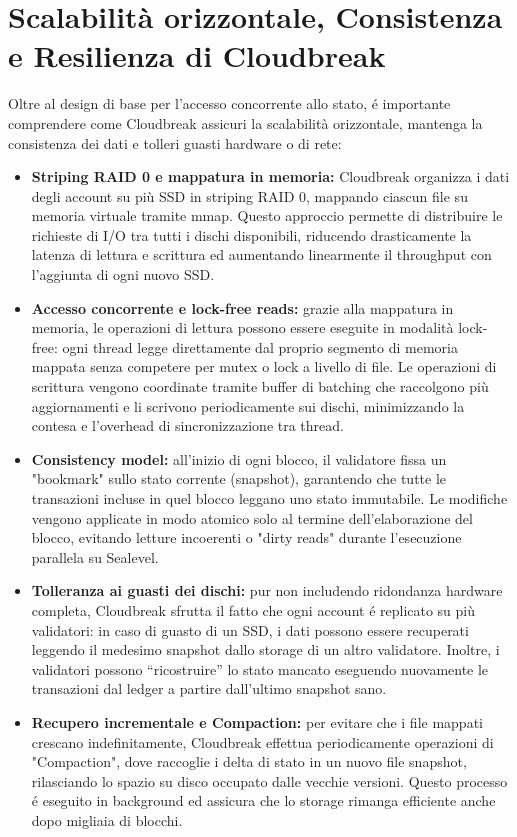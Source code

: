 \documentclass[a4paper,12pt]{report}
\begin{document}
	\section{Scalabilità orizzontale, Consistenza e Resilienza di Cloudbreak}
	Oltre al design di base per l'accesso concorrente allo stato, é importante comprendere come Cloudbreak assicuri la scalabilità orizzontale, mantenga la consistenza dei dati e tolleri guasti hardware o di rete:
	\begin{itemize}
		\item \textbf{Striping RAID 0 e mappatura in memoria:} Cloudbreak organizza i dati degli account su più SSD in striping RAID 0, mappando ciascun file su memoria virtuale tramite mmap. Questo approccio permette di distribuire le richieste di I/O tra tutti i dischi disponibili, riducendo drasticamente la latenza di lettura e scrittura ed aumentando linearmente il throughput con l’aggiunta di ogni nuovo SSD.
		\item \textbf{Accesso concorrente e lock-free reads:} grazie alla mappatura in memoria, le operazioni di lettura possono essere eseguite in modalità lock-free: ogni thread legge direttamente dal proprio segmento di memoria mappata senza competere per mutex o lock a livello di file. Le operazioni di scrittura vengono coordinate tramite buffer di batching che raccolgono più aggiornamenti e li scrivono periodicamente sui dischi, minimizzando la contesa e l’overhead di sincronizzazione tra thread.
		\item \textbf{Consistency model:} all’inizio di ogni blocco, il validatore fissa un "bookmark" sullo stato corrente (snapshot), garantendo che tutte le transazioni incluse in quel blocco leggano uno stato immutabile. Le modifiche vengono applicate in modo atomico solo al termine dell’elaborazione del blocco, evitando letture incoerenti o "dirty reads" durante l’esecuzione parallela su Sealevel.
		\item \textbf{Tolleranza ai guasti dei dischi:} pur non includendo ridondanza hardware completa, Cloudbreak sfrutta il fatto che ogni account é replicato su più validatori: in caso di guasto di un SSD, i dati possono essere recuperati leggendo il medesimo snapshot dallo storage di un altro validatore. Inoltre, i validatori possono “ricostruire” lo stato mancato eseguendo nuovamente le transazioni dal ledger a partire dall’ultimo snapshot sano.
		\item \textbf{Recupero incrementale e Compaction:} per evitare che i file mappati crescano indefinitamente, Cloudbreak effettua periodicamente operazioni di "Compaction", dove raccoglie i delta di stato in un nuovo file snapshot, rilasciando lo spazio su disco occupato dalle vecchie versioni. Questo processo é eseguito in background ed assicura che lo storage rimanga efficiente anche dopo migliaia di blocchi.
	\end{itemize}
	
\end{document}
